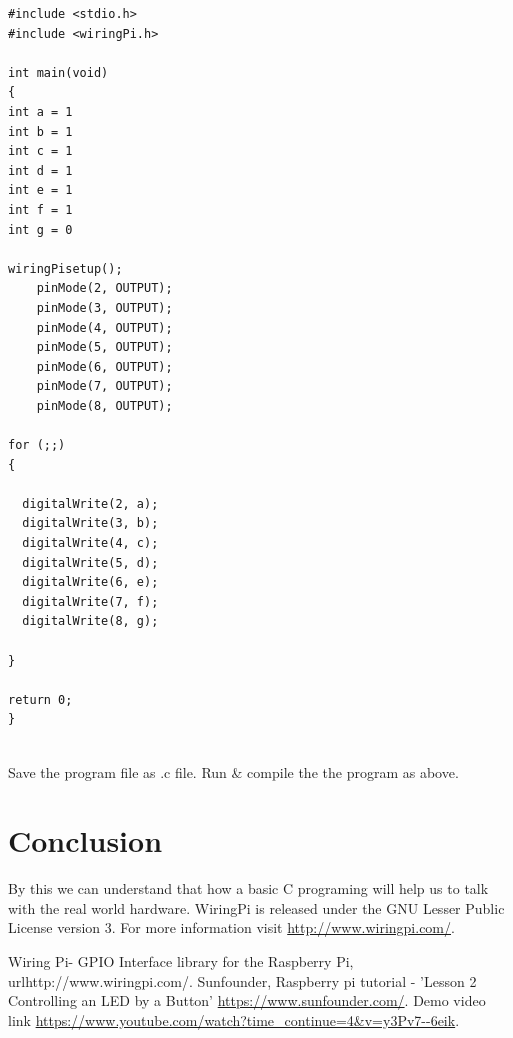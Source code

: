 \documentclass[journal,12pt,twocolumn]{IEEEtran}
\begin{document}
\begin{lstlisting}[frame=single]
#include <stdio.h>
#include <wiringPi.h>

int main(void)
{
int a = 1
int b = 1
int c = 1
int d = 1
int e = 1
int f = 1
int g = 0

wiringPisetup();
    pinMode(2, OUTPUT);  
    pinMode(3, OUTPUT);
    pinMode(4, OUTPUT);
    pinMode(5, OUTPUT);
    pinMode(6, OUTPUT);
    pinMode(7, OUTPUT);
    pinMode(8, OUTPUT);

for (;;)
{

  digitalWrite(2, a); 
  digitalWrite(3, b); 
  digitalWrite(4, c); 
  digitalWrite(5, d); 
  digitalWrite(6, e); 
  digitalWrite(7, f);     
  digitalWrite(8, g); 

}

return 0;
}


\end{lstlisting}  
Save the program file as .c file. Run \& compile the the program as above.

\section{Conclusion}
By this we can understand that how a basic C programing will help us to talk with the real world hardware. WiringPi is released under the GNU Lesser Public License version 3. For more information visit \url{http://www.wiringpi.com/}.

%

\begin{thebibliography}{00}
Wiring Pi- GPIO Interface library for the Raspberry Pi, url{http://www.wiringpi.com/}. 
 Sunfounder, Raspberry pi tutorial - 'Lesson 2 Controlling an LED by a Button' \url{https://www.sunfounder.com/}. Demo video link \url{https://www.youtube.com/watch?time_continue=4&v=y3Pv7--6eik}.
\end{thebibliography}
\end{document}
